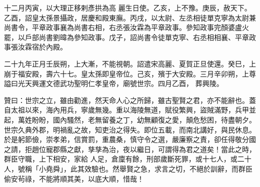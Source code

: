 \begin{pinyinscope}
 十二月丙寅，以大理正移剌彥拱為高
 麗生日使。乙亥，上不豫。庚辰，赦天下。乙酉，詔皇太孫景攝政，居慶和殿東廡。丙戌，以太尉、左丞相徒單克寧為太尉兼尚書令，平章政事襄為尚書右相，右丞張汝霖為平章政事。參知政事完顏婆盧火罷，以戶部尚書劉暐為參知政事。戊子，詔尚書令徒單克寧、右丞相相襄、平章政事張汝霖宿於內殿。



 二十九年正月壬辰朔，上大漸，不能視朝。詔遣宋高麗、夏賀正旦使還。癸巳，上崩于福安殿，壽六十七。皇太孫即皇帝位。己亥，殯于大安殿。三月辛卯朔，上尊謚曰光天興運文德武功聖明仁孝皇帝，廟號世宗。四月乙酉，
 葬興陵。



 贊曰：世宗之立，雖由勸進，然天命人心之所歸，雖古聖賢之君，亦不能辭也。蓋自太祖以來，海內用兵，寧歲無幾。重以海陵無道，賦役繁興，盜賊滿野，兵甲並起，萬姓盼盼，國內騷然，老無留養之丁，幼無顧復之愛，顛危愁困，待盡朝夕。世宗久典外郡，明禍亂之故，知吏治之得失。即位五載，而南北講好，與民休息。於是躬節儉，崇孝弟，信賞罰，重農桑，慎守令之選，嚴廉察之責，卻任得敬分國之請，拒趙位寵郡縣之獻，孳孳為治，夜以繼日，可謂得為君之道矣！當此之時，群臣守職，上下相安，家給
 人足，倉廩有餘，刑部歲斷死罪，或十七人，或二十人，號稱「小堯舜」，此其效驗也。然舉賢之急，求言之切，不絕於訓辭，而群臣偷安茍祿，不能將順其美，以底大順，惜哉！



\end{pinyinscope}